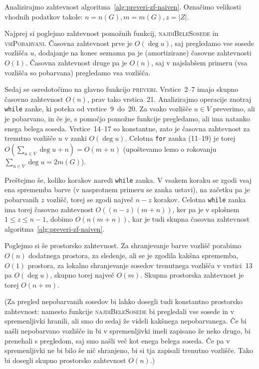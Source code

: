 \documentclass[12pt,a4paper,twoside]{article}
\theoremstyle{definition} %
\theoremstyle{plain} %
\numberwithin{equation}{section}  %
\begin{document}
Analizirajmo zahtevnost algoritma~\ref{alg:preveri-zf-naiven}. Označimo velikosti vhodnih podatkov takole: $n = n(G), m = m(G), z = |Z|$.

Najprej si poglejmo zahtevnost pomožnih funkcij, \textsc{najdiBeleSosede} in \textsc{vsiPobarvani}.
Časovna zahtevnost prve je $O(\deg u)$, saj pregledamo vse sosede vozlišča $u$, dodajanje na konec seznama pa je (amortizirane) časovne zahtevnosti $O(1)$. Časovna zahtevnost druge pa je $O(n)$, saj v najslabšem primeru (vsa vozlišča so pobarvana) pregledamo vsa vozlišča.

Sedaj se osredotočimo na glavno funkcijo \textsc{preveri}. Vrstice~2--7 imajo skupno časovno zahtevnost $O(n)$, prav tako vrstica~21. Analizirajmo operacije znotraj \texttt{while} zanke, ki poteka od vrstice~9~do~20. Za vsako vozlišče $u \in V$ preverimo, ali je pobarvano, in če je, s pomočjo pomožne funkcije pregledamo, ali ima natanko enega belega soseda. Vrstice~14--17 so konstantne, zato je časovna zahtevnost za trenutno vozlišče $u$ v zanki $O(\deg u)$. Celotna \texttt{for} zanka (11--19) je torej $O(\sum_{u \in V} \deg u + n) = O(m + n)$ (upoštevamo lemo o rokovanju $\sum_{u \in V} \deg u = 2 m(G)$). 

Preštejmo še, koliko korakov naredi \texttt{while} zanka. V vsakem koraku se zgodi vsaj ena sprememba barve (v nasprotnem primeru se zanka ustavi), na začetku pa je pobarvanih $z$ vozlišč, torej se zgodi največ $n - z$ korakov. Celotna \texttt{while} zanka ima torej časovno zahtevnost $O((n-z) (m+n))$, ker pa je v splošnem $1 \leq z \leq n-1$, dobimo $O(n(m+n))$, kar je tudi skupna časovna zahtevnost algoritma~\ref{alg:preveri-zf-naiven}.

Poglejmo si še prostorsko zahtevnost. Za shranjevanje barve vozlišč porabimo $O(n)$ dodatnega prostora, za sledenje, ali se je zgodila kakšna sprememba, $O(1)$ prostora, za lokalno shranjevanje sosedov trenutnega vozlišča v vrstici~13 pa $O(\deg u)$, skupno torej največ $O(m)$. Skupna prostorska zahtevnost je torej $O(n + m)$.

(Za pregled nepobarvanih sosedov bi lahko dosegli tudi konstantno prostorsko zahtevnost: namesto funkcije \textsc{najdiBeleSosede} bi pregledali vse sosede in v spremenljivki hranili, ali smo do sedaj že videli kakšnega nepobarvanega. Če bi našli nepobarvano vozlišče in bi v spremenljivki imeli zapisano že neko drugo, bi prenehali s pregledom, saj smo našli več kot enega belega soseda. Če pa v spremenljivki ne bi bilo še nič shranjeno, bi si tja zapisali trenutno vozlišče. Tako bi dosegli skupno prostorsko zahtevnost $O(n)$.)
\end{document}
